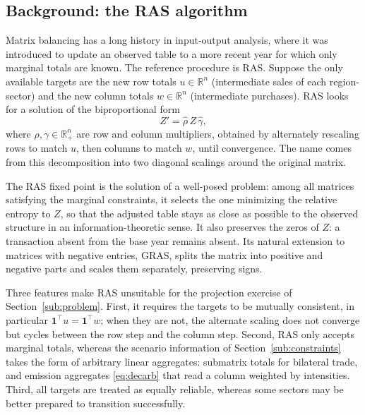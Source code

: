 \documentclass[11pt,a4paper]{article}
\begin{document}
\subsection{Background: the RAS algorithm}
\label{sub:ras}

Matrix balancing has a long history in input-output analysis, where it was introduced to update an observed table to a more recent year for which only marginal totals are known. The reference procedure is RAS. Suppose the only available targets are the new row totals
$u \in \mathbb{R}^n$ (intermediate sales of each region-sector) and the new column totals $w \in \mathbb{R}^n$ (intermediate purchases). RAS looks for a solution of the biproportional form
\begin{equation}\label{eq:ras}
  Z' = \hat{\rho} \, Z \, \hat{\gamma} ,
\end{equation}
where $\rho, \gamma \in \mathbb{R}^n_{+}$ are row and column multipliers, obtained by alternately rescaling rows to match $u$, then columns to match $w$, until convergence. The name comes from this decomposition into two diagonal scalings around the original
matrix.

The RAS fixed point is the solution of a well-posed problem: among all matrices satisfying the marginal constraints, it selects the one minimizing the relative entropy to $Z$, so that the adjusted table stays as close as possible to the observed structure in an
information-theoretic sense. It also preserves the zeros of $Z$: a transaction absent from the base year remains absent. Its natural extension to matrices with negative entries, GRAS, splits the matrix into positive and negative parts and scales them separately, preserving signs.

Three features make RAS unsuitable for the projection exercise of
Section~\ref{sub:problem}. First, it requires the targets to be mutually consistent, in particular $\mathbf{1}^\top u = \mathbf{1}^\top w$; when they are not, the alternate
scaling does not converge but cycles between the row step and the column step. Second, RAS only accepts marginal totals, whereas the scenario information of Section~\ref{sub:constraints} takes the form of arbitrary linear aggregates: submatrix totals for bilateral trade, and emission aggregates \eqref{eq:decarb} that read a column
weighted by intensities. Third, all targets are treated as equally reliable, whereas some sectors may be better prepared to transition successfully.
\end{document}
